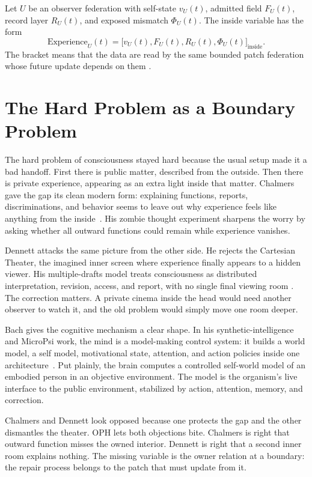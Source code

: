 \documentclass[11pt]{article}
\theoremstyle{remark}
\theoremstyle{plain}
\begin{document}
Let \(U\) be an observer federation with self-state \(v_U(t)\), admitted field
\(F_U(t)\), record layer \(R_U(t)\), and exposed mismatch \(\Phi_U(t)\). The
inside variable has the form
\[
\mathrm{Experience}_U(t)=
\bigl[v_U(t),F_U(t),R_U(t),\Phi_U(t)\bigr]_{\mathrm{inside}}.
\]
The bracket means that the data are read by the same bounded patch federation
whose future update depends on them
\cite{OPHThinking,OPHConsciousness}.

\section{The Hard Problem as a Boundary Problem}

The hard problem of consciousness stayed hard because the usual setup made it
a bad handoff. First there is public matter, described from the outside. Then
there is private experience, appearing as an extra light inside that matter.
Chalmers gave the gap its clean modern form: explaining functions, reports,
discriminations, and behavior seems to leave out why experience feels like
anything from the inside~\cite{Chalmers1995}. His zombie thought experiment
sharpens the worry by asking whether all outward functions could remain while
experience vanishes.

Dennett attacks the same picture from the other side. He rejects the Cartesian
Theater, the imagined inner screen where experience finally appears to a hidden
viewer. His multiple-drafts model treats consciousness as distributed
interpretation, revision, access, and report, with no single final viewing room
\cite{Dennett1991}. The correction matters. A private cinema inside the
head would need another observer to watch it, and the old problem would simply
move one room deeper.

Bach gives the cognitive mechanism a clear shape. In his synthetic-intelligence
and MicroPsi work, the mind is a model-making control system: it builds a world
model, a self model, motivational state, attention, and action policies inside
one architecture~\cite{Bach2009,BachMicroPsi2006}. Put plainly, the brain
computes a controlled self-world model of an embodied person in an
objective environment. The model is the organism's live interface to the
public environment,
stabilized by action, attention, memory, and correction.

Chalmers and Dennett look opposed because one protects the gap and the other
dismantles the theater. OPH lets both objections bite. Chalmers is right that
outward function misses the owned interior. Dennett is right that a second
inner room explains nothing. The missing variable is the owner relation at a
boundary: the repair process belongs to the patch that must update from it.
\end{document}
